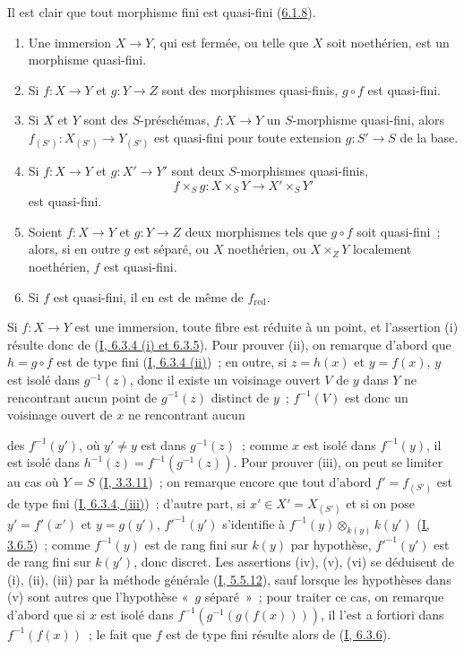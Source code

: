 Il est clair que tout morphisme fini est quasi-fini
(\hyperref[II.6.1.8-fr]{6.1.8}).

\begin{proposition}[6.2.4]
\label{II.6.2.4-fr}
\begin{enumerate}
\item[(i)] Une immersion $X\to Y$, qui est fermée, ou telle que $X$ soit
noethérien, est un morphisme quasi-fini.
\item[(ii)] Si $f:X\to Y$ et $g:Y\to Z$ sont des morphismes quasi-finis,
$g\circ f$ est quasi-fini.
\item[(iii)] Si $X$ et $Y$ sont des $S$-préschémas, $f:X\to Y$ un
$S$-morphisme quasi-fini, alors $f_{(S')}:X_{(S')}\to Y_{(S')}$ est quasi-fini
pour toute extension $g:S'\to S$ de la base.
\item[(iv)] Si $f:X\to Y$ et $g:X'\to Y'$ sont deux $S$-morphismes
quasi-finis,
\[
f\times_S g:X\times_S Y\to X'\times_S Y'
\]
est quasi-fini.
\item[(v)] Soient $f:X\to Y$ et $g:Y\to Z$ deux morphismes tels que $g\circ
f$ soit quasi-fini~; alors, si en outre $g$ est séparé, ou $X$ noethérien, ou
$X\times_ZY$ localement noethérien, $f$ est quasi-fini.
\item[(vi)] Si $f$ est quasi-fini, il en est de même de $f_{\mathrm{red}}$.
\end{enumerate}
\end{proposition}

Si $f:X\to Y$ est une immersion, toute fibre est réduite à un point, et
l'assertion (i) résulte donc de (\hyperref[I.6.3.4-fr]{I, 6.3.4 (i) et
6.3.5}). Pour prouver (ii), on remarque d'abord que $h=g\circ f$ est de type
fini (\hyperref[I.6.3.4-fr]{I, 6.3.4 (ii)})~; en outre, si $z=h(x)$ et
$y=f(x)$, $y$ est isolé dans $g^{-1}(z)$, donc il existe un voisinage ouvert
$V$ de $y$ dans $Y$ ne rencontrant aucun point de $g^{-1}(z)$ distinct de
$y$~; $f^{-1}(V)$ est donc un voisinage ouvert de $x$ ne rencontrant aucun


des $f^{-1}(y')$, où $y'\neq y$ est dans $g^{-1}(z)$~; comme $x$ est isolé
dans $f^{-1}(y)$, il est isolé dans
$h^{-1}(z)=f^{-1}(g^{-1}(z))$. Pour prouver (iii), on peut se limiter au cas
où $Y=S$ (\hyperref[I.3.3.11-fr]{I, 3.3.11})~; on remarque encore que tout
d'abord $f'=f_{(S')}$ est de type fini
(\hyperref[I.6.3.4-fr]{I, 6.3.4, (iii)})~; d'autre part, si
$x'\in X'=X_{(S')}$ et si on pose $y'=f'(x')$ et $y=g(y')$,
$f'^{-1}(y')$ s'identifie à
$f^{-1}(y)\otimes_{k(y)}k(y')$ (\hyperref[I.3.6.5-fr]{I, 3.6.5})~; comme
$f^{-1}(y)$ est de rang fini sur $k(y)$ par hypothèse, $f'^{-1}(y')$ est de
rang fini sur $k(y')$, donc discret. Les assertions (iv), (v), (vi) se
déduisent de (i), (ii), (iii) par la méthode générale
(\hyperref[I.5.5.12-fr]{I, 5.5.12}), sauf lorsque les hypothèses dans (v) sont
autres que l'hypothèse «~$g$ séparé~»~; pour traiter ce cas, on remarque
d'abord que si $x$ est isolé dans
$f^{-1}(g^{-1}(g(f(x))))$, il l'est a fortiori dans $f^{-1}(f(x))$~; le fait
que $f$ est de type fini résulte alors de
(\hyperref[I.6.3.6-fr]{I, 6.3.6}).

